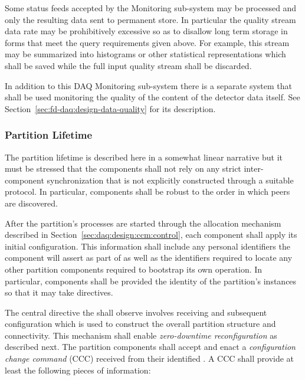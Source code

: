 Some status feeds accepted by the Monitoring sub-system may be processed and only the resulting data sent to permanent store. 
In particular the quality stream data rate may be prohibitively excessive so as to disallow long term storage in forms that meet the query requirements given above. 
For example, this stream may be summarized into histograms or other statistical representations which shall be saved while the full input quality stream shall be discarded.

In addition to this DAQ  Monitoring sub-system there is a separate system that shall be used monitoring the quality of the content of the detector data itself.  See Section~\ref{sec:fd-daq:design-data-quality} for its description.

\subsubsection{Partition Lifetime}
\label{sec:daq:partition-lifetime}

The partition lifetime is described here in a somewhat linear narrative but it must be stressed that the components shall not rely on any strict inter-component synchronization that is not explicitly constructed through a suitable protocol. 
In particular, components shall be robust to the order in which peers are discovered.

After the partition's processes are started through the allocation mechanism described in Section~\ref{sec:daq:design:ccm:control}, each component shall apply its initial configuration. 
This information shall include any personal identifiers the component will assert as part of  as well as the identifiers required to locate any other partition components required to bootstrap its own operation. 
In particular, components shall be provided the identity of the partition's  instances so that it may take directives.

The central directive the shall observe involves receiving and subsequent configuration which is used to construct the overall partition structure and connectivity.  
This mechanism shall enable \textit{zero-downtime reconfiguration} as described next.
The partition components shall accept and enact a \textit{configuration change command} (CCC) received from their identified . 
A CCC shall provide at least the following pieces of information:

